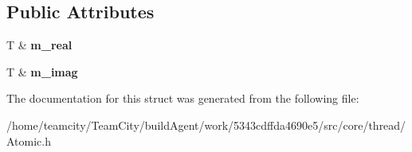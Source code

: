 \subsection*{Public Attributes}
\begin{DoxyCompactItemize}
\item 
T \& {\bfseries m\+\_\+real}\hypertarget{structAtomic_3_01std_1_1complex_3_01T_01_4_01_4_a9def64112ed5fdbbbd8ed139299d118a}{}\label{structAtomic_3_01std_1_1complex_3_01T_01_4_01_4_a9def64112ed5fdbbbd8ed139299d118a}

\item 
T \& {\bfseries m\+\_\+imag}\hypertarget{structAtomic_3_01std_1_1complex_3_01T_01_4_01_4_a208d83261b1bdba3c17f40e37988f0da}{}\label{structAtomic_3_01std_1_1complex_3_01T_01_4_01_4_a208d83261b1bdba3c17f40e37988f0da}

\end{DoxyCompactItemize}


The documentation for this struct was generated from the following file\+:\begin{DoxyCompactItemize}
\item 
/home/teamcity/\+Team\+City/build\+Agent/work/5343cdffda4690e5/src/core/thread/Atomic.\+h\end{DoxyCompactItemize}

